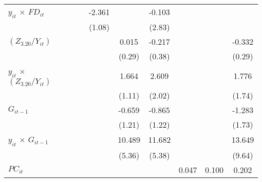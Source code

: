 \documentclass[12pt, a4paper]{article}
\begin{document}
\begin{table}
\begin{threeparttable}
{\begin{tabular}{l*{9}{c}}
				$y_{it}$ $\times$ $FD_{it}$ &                     &                     &                     &      -2.361\sym{*}  &                     &      -0.103         &                     &                     &                     \\
				&                     &                     &                     &      (1.08)         &                     &      (2.83)         &                     &                     &                     \\
				$(Z_{3.20}/Y_{it})$         &                     &                     &                     &                     &       0.015         &      -0.217         &                     &                     &      -0.332         \\
				&                     &                     &                     &                     &      (0.29)         &      (0.38)         &                     &                     &      (0.29)         \\
				$y_{it}$ $\times$ $(Z_{3.20}/Y_{it})$&                     &                     &                     &                     &       1.664         &       2.609         &                     &                     &       1.776         \\
				&                     &                     &                     &                     &      (1.11)         &      (2.02)         &                     &                     &      (1.74)         \\
				$G_{it-1}$            &                     &                     &                     &                     &      -0.659         &      -0.865         &                     &                     &      -1.283         \\
				&                     &                     &                     &                     &      (1.21)         &      (1.22)         &                     &                     &      (1.73)         \\
				$y_{it}$ $\times$ $G_{it-1}$&                     &                     &                     &                     &      10.489         &      11.682\sym{*}  &                     &                     &      13.649         \\
				&                     &                     &                     &                     &      (5.36)         &      (5.38)         &                     &                     &      (9.64)         \\
				$PC_{it}$                &                     &                     &                     &                     &                     &                     &       0.047         &       0.100         &       0.202         \\

\end{tabular}}
\end{threeparttable}
\end{table}
\end{document}
